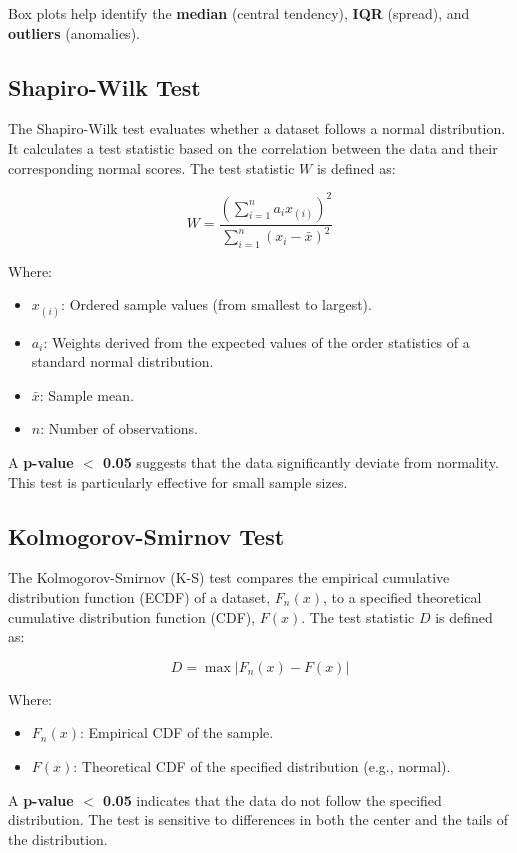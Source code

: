 Box plots help identify the \textbf{median} (central tendency), \textbf{IQR} (spread), and \textbf{outliers} (anomalies).

\subsection{Shapiro-Wilk Test} \label{appendix:shapiro}
The Shapiro-Wilk test evaluates whether a dataset follows a normal distribution. It calculates a test statistic based on the correlation between the data and their corresponding normal scores. The test statistic \(W\) is defined as:

\[
W = \frac{\left( \sum_{i=1}^{n} a_i x_{(i)} \right)^2}{\sum_{i=1}^{n} (x_i - \bar{x})^2}
\]

Where:
\begin{itemize}
    \item \(x_{(i)}\): Ordered sample values (from smallest to largest).
    \item \(a_i\): Weights derived from the expected values of the order statistics of a standard normal distribution.
    \item \(\bar{x}\): Sample mean.
    \item \(n\): Number of observations.
\end{itemize}

A \textbf{p-value $<$ 0.05} suggests that the data significantly deviate from normality. This test is particularly effective for small sample sizes. \cite{shapiro1965}

\subsection{Kolmogorov-Smirnov Test} \label{appendix:kolmogorov}
The Kolmogorov-Smirnov (K-S) test compares the empirical cumulative distribution function (ECDF) of a dataset, \(F_n(x)\), to a specified theoretical cumulative distribution function (CDF), \(F(x)\). The test statistic \(D\) is defined as:

\[
D = \max | F_n(x) - F(x) |
\]

Where:
\begin{itemize}
    \item \(F_n(x)\): Empirical CDF of the sample.
    \item \(F(x)\): Theoretical CDF of the specified distribution (e.g., normal).
\end{itemize}

A \textbf{p-value $<$ 0.05} indicates that the data do not follow the specified distribution. The test is sensitive to differences in both the center and the tails of the distribution. \cite{smirnov1948}

